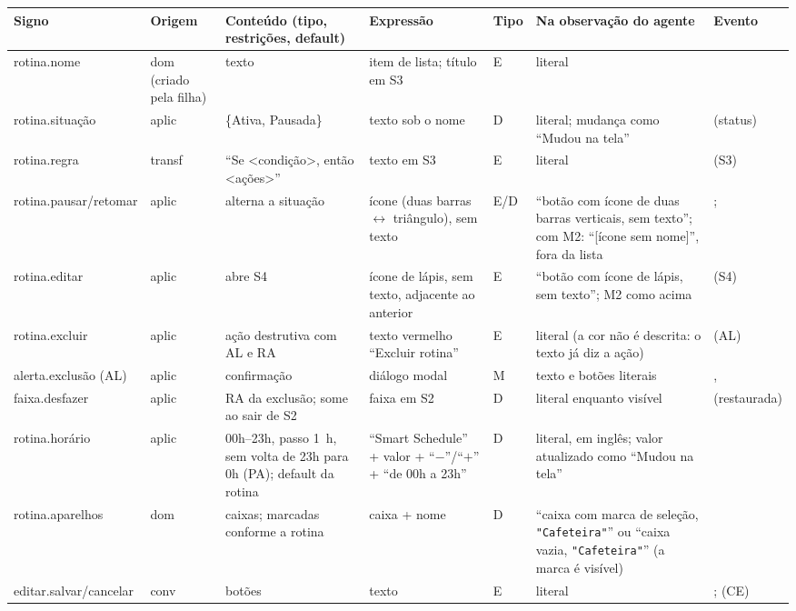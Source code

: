 \setlength{\tabcolsep}{3pt}
\begin{tabularx}{\textwidth}{@{}P{2.2cm}P{0.9cm}P{2.6cm}P{2.2cm}P{0.5cm}YP{2.3cm}@{}}
\toprule
\textbf{Signo} & \textbf{Origem} & \textbf{Conteúdo (tipo, restrições, default)} & \textbf{Expressão} & \textbf{Tipo} & \textbf{Na observação do agente} & \textbf{Evento} \\
\midrule
rotina.nome & dom (criado pela filha) & texto & item de lista; título em S3 & E & literal &  \\
rotina.situação & aplic & \{Ativa, Pausada\} & texto sob o nome & D & literal; mudança como ``Mudou na tela'' & (status) \\
rotina.regra & transf & ``Se <condição>, então <ações>'' & texto em S3 & E & literal & (S3) \\
rotina.pausar/retomar & aplic & alterna a situação & ícone (duas barras $\leftrightarrow$ triângulo), sem texto & E/D & ``botão com ícone de duas barras verticais, sem texto''; com M2: ``[ícone sem nome]'', fora da lista & ;  \\
rotina.editar & aplic & abre S4 & ícone de lápis, sem texto, adjacente ao anterior & E & ``botão com ícone de lápis, sem texto''; M2 como acima & (S4) \\
rotina.excluir & aplic & ação destrutiva com AL e RA & texto vermelho ``Excluir rotina'' & E & literal (a cor não é descrita: o texto já diz a ação) & (AL) \\
alerta.exclusão (AL) & aplic & confirmação & diálogo modal & M & texto e botões literais & ,  \\
faixa.desfazer & aplic & RA da exclusão; some ao sair de S2 & faixa em S2 & D & literal enquanto visível & (restaurada) \\
rotina.horário & aplic & 00h--23h, passo 1~h, sem volta de 23h para 0h (PA); default da rotina & ``Smart Schedule'' + valor + ``$-$''/``$+$'' + ``de 00h a 23h'' & D & literal, em inglês; valor atualizado como ``Mudou na tela'' &  \\
rotina.aparelhos & dom & caixas; marcadas conforme a rotina & caixa + nome & D & ``caixa com marca de seleção, \texttt{"Cafeteira"}'' ou ``caixa vazia, \texttt{"Cafeteira"}'' (a marca é visível) &  \\
editar.salvar/cancelar & conv & botões & texto & E & literal & ; (CE) \\

\end{tabularx}
